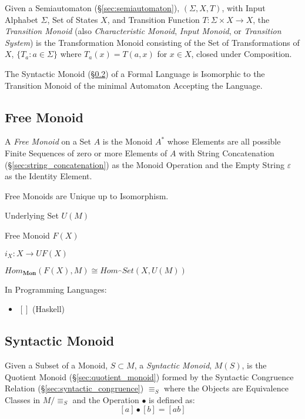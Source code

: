 Given a Semiautomaton (\S\ref{sec:semiautomaton}), $(\Sigma, X, T)$,
with Input Alphabet $\Sigma$, Set of States $X$, and Transition
Function $T : \Sigma \times X \rightarrow X$, the \emph{Transition
  Monoid} (also \emph{Characteristic Monoid}, \emph{Input Monoid}, or
\emph{Transition System}) is the Transformation Monoid consisting of
the Set of Transformations of $X$, $\{T_a : a \in \Sigma\}$ where
$T_a(x) = T(a,x)$ for $x \in X$, closed under Composition.

The Syntactic Monoid (\S\ref{sec:syntactic_monoid}) of a Formal
Language is Isomorphic to the Transition Monoid of the minimal
Automaton Accepting the Language.



\subsection{Free Monoid}\label{sec:free_monoid}

A \emph{Free Monoid} on a Set $A$ is the Monoid $A^*$ whose Elements
are all possible Finite Sequences of zero or more Elements of $A$ with
String Concatenation (\S\ref{sec:string_concatenation}) as the Monoid
Operation and the Empty String $\varepsilon$ as the Identity Element.

Free Monoids are Unique up to Isomorphism.

Underlying Set $U(M)$

Free Monoid $F(X)$

$i_X : X \rightarrow U F (X)$

$Hom_\mathbf{Mon}(F(X), M) \cong Hom_\cat{Set}(X, U(M))$

In Programming Languages:

\begin{itemize}
  \item $\mathtt{[]}$ (Haskell)
\end{itemize}



\subsection{Syntactic Monoid}\label{sec:syntactic_monoid}

Given a Subset of a Monoid, $S \subset M$, a \emph{Syntactic Monoid},
$M(S)$, is the Quotient Monoid (\S\ref{sec:quotient_monoid}) formed by
the Syntactic Congruence Relation (\S\ref{sec:syntactic_congruence})
$\equiv_S$ where the Objects are Equivalence Classes in $M / \equiv_S$
and the Operation $\bullet$ is defined as:
\[
  [a] \bullet [b] = [ab]
\]

